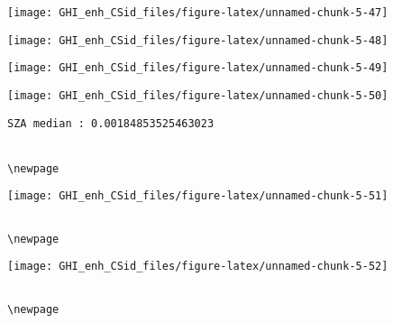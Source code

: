 \documentclass[
  10pt,
  a4paper,oneside]{article}
\begin{document}
\begin{center}\texttt{[image: GHI\_enh\_CSid\_files/figure-latex/unnamed-chunk-5-47]} \end{center}

\begin{center}\texttt{[image: GHI\_enh\_CSid\_files/figure-latex/unnamed-chunk-5-48]} \end{center}

\begin{center}\texttt{[image: GHI\_enh\_CSid\_files/figure-latex/unnamed-chunk-5-49]} \end{center}

\begin{center}\texttt{[image: GHI\_enh\_CSid\_files/figure-latex/unnamed-chunk-5-50]} \end{center}

\begin{verbatim}
SZA median : 0.00184853525463023 


\newpage
\end{verbatim}

\begin{center}\texttt{[image: GHI\_enh\_CSid\_files/figure-latex/unnamed-chunk-5-51]} \end{center}

\begin{verbatim}

\newpage
\end{verbatim}

\begin{center}\texttt{[image: GHI\_enh\_CSid\_files/figure-latex/unnamed-chunk-5-52]} \end{center}

\begin{verbatim}

\newpage
\end{verbatim}
\end{document}
